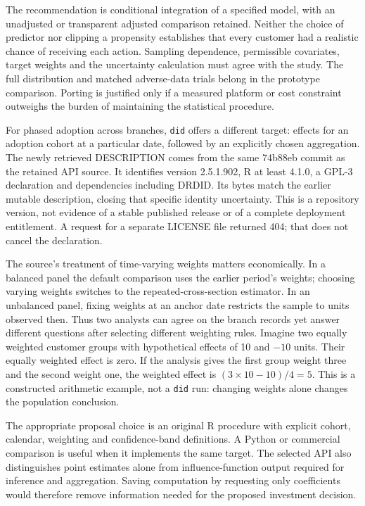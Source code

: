 The recommendation is conditional integration of a specified model, with an
unadjusted or transparent adjusted comparison retained. Neither the choice of
predictor nor clipping a propensity establishes that every customer had a
realistic chance of receiving each action. Sampling dependence, permissible
covariates, target weights and the uncertainty calculation must agree with the
study. The full distribution and matched adverse-data trials belong in the
prototype comparison. Porting is justified only if a measured platform or
cost constraint outweighs the burden of maintaining the statistical procedure.

For phased adoption across branches, \texttt{did} offers a different target:
effects for an adoption cohort at a particular date, followed by an explicitly
chosen aggregation. The newly retrieved DESCRIPTION comes from the same
74b88eb commit as the retained API source. It identifies version 2.5.1.902,
R at least 4.1.0, a GPL-3 declaration and dependencies including DRDID.
Its bytes match the earlier mutable description, closing that specific
identity uncertainty. This is a repository version, not evidence of a stable
published release or of a complete deployment entitlement. A request for a
separate LICENSE file returned 404; that does not cancel the declaration.
\citep{survey29did,exec24_panelr_did}

The source's treatment of time-varying weights matters economically. In a
balanced panel the default comparison uses the earlier period's weights;
choosing varying weights switches to the repeated-cross-section estimator.
In an unbalanced panel, fixing weights at an anchor date restricts the sample
to units observed then. Thus two analysts can agree on the branch records yet
answer different questions after selecting different weighting rules. Imagine
two equally weighted customer groups with hypothetical effects of 10 and
$-10$ units. Their equally weighted effect is zero. If the analysis gives
the first group weight three and the second weight one, the weighted effect
is $(3\times10-10)/4=5$. This is a constructed arithmetic example, not a
\texttt{did} run: changing weights alone changes the population conclusion.
\citep{survey29didapi}

The appropriate proposal choice is an original R procedure with explicit
cohort, calendar, weighting and confidence-band definitions. A Python or
commercial comparison is useful when it implements the same target. The
selected API also distinguishes point estimates alone from influence-function
output required for inference and aggregation. Saving computation by requesting
only coefficients would therefore remove information needed for the proposed
investment decision. \citep{survey29didapi}

